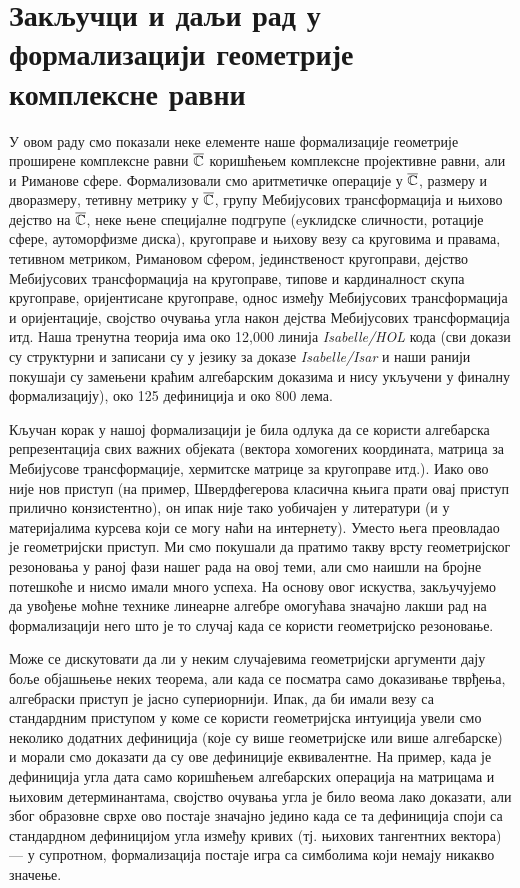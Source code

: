 \section{Закључци и даљи рад у формализацији геометрије комплексне равни}
\label{sec:concl}
У овом раду смо показали неке елементе наше формализације геометрије
проширене комплексне равни $\overline{\mathbb{C}}$ коришћењем комплексне пројективне
равни, али и Риманове сфере. Формализовали смо аритметичке операције у
$\overline{\mathbb{C}}$, размеру и дворазмеру, тетивну метрику у $\overline{\mathbb{C}}$, групу
Мебијусових трансформација и њихово дејство на $\overline{\mathbb{C}}$, неке њене
специјалне подгрупе (eуклидске сличности, ротације сфере, аутоморфизме
диска), кругоправе и њихову везу са круговима и правама, тетивном
метриком, Римановом сфером, јединственост кругоправи, дејство
Мебијусових трансформација на кругоправе, типове и кардиналност скупа
кругоправе, оријентисане кругоправе, однос између Мебијусових
трансформација и оријентације, својство очувања угла након дејства
Мебијусових трансформација итд. Наша тренутна теорија има око 12,000
линија \emph{Isabelle/HOL} кода (сви докази су структурни и записани
су у језику за доказе \emph{Isabelle/Isar} и наши ранији покушаји су
замењени краћим алгебарским доказима и нису укључени у финалну
формализацију), око 125 дефиниција и око 800 лема.

Кључан корак у нашој формализацији је била одлука да се користи
алгебарска репрезентација свих важних објеката (вектора хомогених
координата, матрица за Мебијусове трансформације, хермитске матрице за
кругоправе итд.). Иако ово није нов приступ (на пример, Швердфегерова
класична књига \cite{schwerdtfeger} прати овај приступ прилично
конзистентно), он ипак није тако уобичајен у литератури (и у
материјалима курсева који се могу наћи на интернету). Уместо њега
преовладао је геометријски приступ.  Ми смо покушали да пратимо такву
врсту геометријског резоновања у раној фази нашег рада на овој теми,
али смо наишли на бројне потешкоће и нисмо имали много успеха. На
основу овог искуства, закључујемо да увођење моћне технике линеарне
алгебре омогућава значајно лакши рад на формализацији него што је то
случај када се користи геометријско резоновање.

Може се дискутовати да ли у неким случајевима геометријски аргументи
дају боље објашњење неких теорема, али када се посматра само
доказивање тврђења, алгебраски приступ је јасно супериорнији. Ипак, да
би имали везу са стандардним приступом у коме се користи геометријска
интуиција увели смо неколико додатних дефиниција (које су више
геометријске или више алгебарске) и морали смо доказати да су ове
дефиниције еквивалентне. На пример, када је дефиниција угла дата само
коришћењем алгебарских операција на матрицама и њиховим
детерминантама, својство очувања угла је било веома лако доказати, али
због образовне сврхе ово постаје значајно једино када се та дефиниција
споји са стандардном дефиницијом угла између кривих (тј. њихових
тангентних вектора) --- у супротном, формализација постаје игра са
симболима који немају никакво значење.

